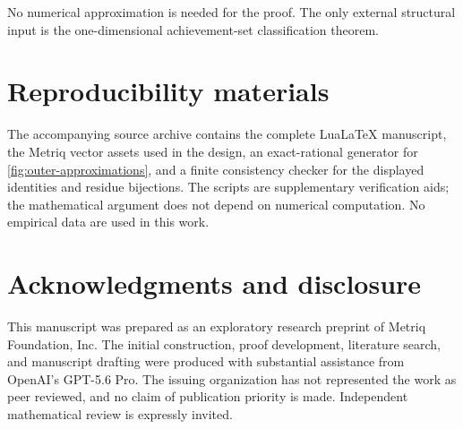 \documentclass[11pt,letterpaper]{article}
\theoremstyle{metriqthm}
\theoremstyle{metriqdef}
\begin{document}
No numerical approximation is needed for the proof. The only external structural input is the one-dimensional achievement-set classification theorem.

\section*{Reproducibility materials}
The accompanying source archive contains the complete Lua\LaTeX{} manuscript, the Metriq vector assets used in the design, an exact-rational generator for \cref{fig:outer-approximations}, and a finite consistency checker for the displayed identities and residue bijections. The scripts are supplementary verification aids; the mathematical argument does not depend on numerical computation. No empirical data are used in this work.

\section*{Acknowledgments and disclosure}

This manuscript was prepared as an exploratory research preprint of Metriq Foundation, Inc. The initial construction, proof development, literature search, and manuscript drafting were produced with substantial assistance from OpenAI's GPT-5.6 Pro. The issuing organization has not represented the work as peer reviewed, and no claim of publication priority is made. Independent mathematical review is expressly invited.
\end{document}
